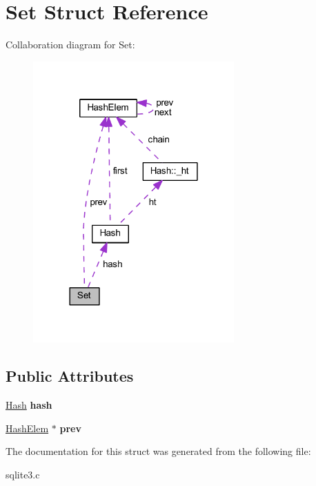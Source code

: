 \hypertarget{struct_set}{\section{Set Struct Reference}
\label{struct_set}
}


Collaboration diagram for Set\-:\nopagebreak
\begin{figure}[H]
\begin{center}
\leavevmode
\includegraphics[width=218pt]{struct_set__coll__graph}
\end{center}
\end{figure}
\subsection*{Public Attributes}
\begin{DoxyCompactItemize}
\item 
\hypertarget{struct_set_aeea736b00f6b4351bfe703722fffc6f9}{\hyperlink{struct_hash}{Hash} {\bfseries hash}}\label{struct_set_aeea736b00f6b4351bfe703722fffc6f9}

\item 
\hypertarget{struct_set_aebad2b96aa6e907b06ad5c3258879643}{\hyperlink{struct_hash_elem}{Hash\-Elem} $\ast$ {\bfseries prev}}\label{struct_set_aebad2b96aa6e907b06ad5c3258879643}

\end{DoxyCompactItemize}


The documentation for this struct was generated from the following file\-:\begin{DoxyCompactItemize}
\item 
sqlite3.\-c\end{DoxyCompactItemize}
